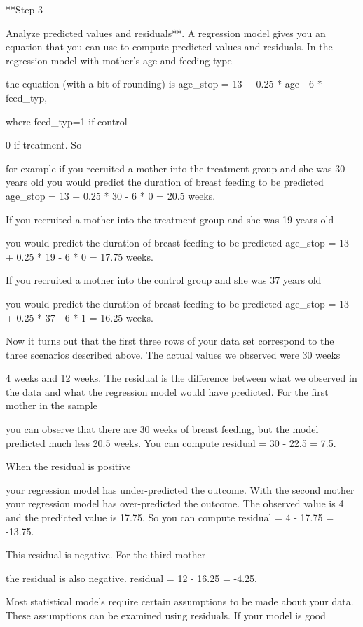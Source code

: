 \documentclass[
  letterpaper,
  DIV=11,
  numbers=noendperiod]{scrreprt}
\begin{document}
\begin{tcolorbox}
**Step 3

Analyze predicted values and residuals**. A regression model gives you
an equation that you can use to compute predicted values and residuals.
In the regression model with mother's age and feeding type

the equation (with a bit of rounding) is age\_stop = 13 + 0.25 * age - 6
* feed\_typ,

where feed\_typ=1 if control

0 if treatment. So

for example if you recruited a mother into the treatment group and she
was 30 years old you would predict the duration of breast feeding to be
predicted age\_stop = 13 + 0.25 * 30 - 6 * 0 = 20.5 weeks.

If you recruited a mother into the treatment group and she was 19 years
old

you would predict the duration of breast feeding to be predicted
age\_stop = 13 + 0.25 * 19 - 6 * 0 = 17.75 weeks.

If you recruited a mother into the control group and she was 37 years
old

you would predict the duration of breast feeding to be predicted
age\_stop = 13 + 0.25 * 37 - 6 * 1 = 16.25 weeks.

Now it turns out that the first three rows of your data set correspond
to the three scenarios described above. The actual values we observed
were 30 weeks

4 weeks and 12 weeks. The residual is the difference between what we
observed in the data and what the regression model would have predicted.
For the first mother in the sample

you can observe that there are 30 weeks of breast feeding, but the model
predicted much less 20.5 weeks. You can compute residual = 30 - 22.5 =
7.5.

When the residual is positive

your regression model has under-predicted the outcome. With the second
mother your regression model has over-predicted the outcome. The
observed value is 4 and the predicted value is 17.75. So you can compute
residual = 4 - 17.75 = -13.75.

This residual is negative. For the third mother

the residual is also negative. residual = 12 - 16.25 = -4.25.

Most statistical models require certain assumptions to be made about
your data. These assumptions can be examined using residuals. If your
model is good


\end{tcolorbox}
\end{document}
